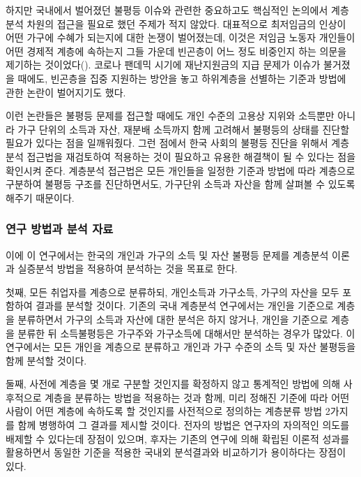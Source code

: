 \documentclass[
  letterpaper,
  DIV=11,
  numbers=noendperiod]{scrartcl}
\begin{document}
하지만 국내에서 벌어졌던 불평등 이슈와 관련한 중요하고도 핵심적인
논의에서 계층분석 차원의 접근을 필요로 했던 주제가 적지 않았다.
대표적으로 최저임금의 인상이 어떤 가구에 수혜가 되는지에 대한 논쟁이
벌어졌는데, 이것은 저임금 노동자 개인들이 어떤 경제적 계층에 속하는지
그들 가운데 빈곤층이 어느 정도 비중인지 하는 의문을 제기하는
것이었다(). 코로나 팬데믹
시기에 재난지원금의 지급 문제가 이슈가 불거졌을 때에도, 빈곤층을 집중
지원하는 방안을 놓고 하위계층을 선별하는 기준과 방법에 관한 논란이
벌어지기도 했다.

이런 논란들은 불평등 문제를 접근할 때에도 개인 수준의 고용상 지위와
소득뿐만 아니라 가구 단위의 소득과 자산, 재분배 소득까지 함께 고려해서
불평등의 상태를 진단할 필요가 있다는 점을 일깨워줬다. 그런 점에서 한국
사회의 불평등 진단을 위해서 계층분석 접근법을 재검토하여 적용하는 것이
필요하고 유용한 해결책이 될 수 있다는 점을 확인시켜 준다. 계층분석
접근법은 모든 개인들을 일정한 기준과 방법에 따라 계층으로 구분하여
불평등 구조를 진단하면서도, 가구단위 소득과 자산을 함께 살펴볼 수 있도록
해주기 때문이다.

\subsubsection{연구 방법과 분석
자료}\label{uxc5f0uxad6c-uxbc29uxbc95uxacfc-uxbd84uxc11d-uxc790uxb8cc}

이에 이 연구에서는 한국의 개인과 가구의 소득 및 자산 불평등 문제를
계층분석 이론과 실증분석 방법을 적용하여 분석하는 것을 목표로 한다.

첫째, 모든 취업자를 계층으로 분류하되, 개인소득과 가구소득, 가구의
자산을 모두 포함하여 결과를 분석할 것이다. 기존의 국내 계층분석
연구에서는 개인을 기준으로 계층을 분류하면서 가구의 소득과 자산에 대한
분석은 하지 않거나, 개인을 기준으로 계층을 분류한 뒤 소득불평등은
가구주와 가구소득에 대해서만 분석하는 경우가 많았다. 이 연구에서는 모든
개인을 계층으로 분류하고 개인과 가구 수준의 소득 및 자산 불평등을 함께
분석할 것이다.

둘째, 사전에 계층을 몇 개로 구분할 것인지를 확정하지 않고 통계적인
방법에 의해 사후적으로 계층을 분류하는 방법을 적용하는 것과 함께, 미리
정해진 기준에 따라 어떤 사람이 어떤 계층에 속하도록 할 것인지를
사전적으로 정의하는 계층분류 방법 2가지를 함께 병행하여 그 결과를 제시할
것이다. 전자의 방법은 연구자의 자의적인 의도를 배제할 수 있다는데 장점이
있으며, 후자는 기존의 연구에 의해 확립된 이론적 성과를 활용하면서 동일한
기준을 적용한 국내외 분석결과와 비교하기가 용이하다는 장점이 있다.
\end{document}
